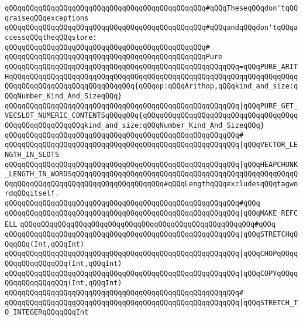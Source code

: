 \verb|qQQqqQQqqQQqqQQqqQQqqQQqqQQqqQQqqQQqqQQqqQQqqQQq#qQQqTheseqQQqdon'tqQQqraiseqQQqexceptions|\newline
\verb|qQQqqQQqqQQqqQQqqQQqqQQqqQQqqQQqqQQqqQQqqQQqqQQq#qQQqandqQQqdon'tqQQqaccessqQQqtheqQQqstore:|\newline
\verb|qQQqqQQqqQQqqQQqqQQqqQQqqQQqqQQqqQQqqQQqqQQqqQQq#|\newline
\verb|qQQqqQQqqQQqqQQqqQQqqQQqqQQqqQQqqQQqqQQqqQQqqQQqPure|\newline
\verb|qQQqqQQqqQQqqQQqqQQqqQQqqQQqqQQqqQQqqQQqqQQqqQQqqQQqqQQq=qQQqPURE_ARITHqQQqqQQqqQQqqQQqqQQqqQQqqQQqqQQqqQQqqQQqqQQqqQQqqQQqqQQqqQQqqQQqqQQqqQQqqQQqqQQqqQQqqQQqqQQqqQQqqQQq{qQQqop:qQQqArithop,qQQqkind_and_size:qQQqNumber_Kind_And_SizeqQQq}|\newline
\verb|qQQqqQQqqQQqqQQqqQQqqQQqqQQqqQQqqQQqqQQqqQQqqQQqqQQqqQQq|\verb#|qQQqPURE_GET_VECSLOT_NUMERIC_CONTENTSqQQqqQQq{qQQqqQQqqQQqqQQqqQQqqQQqqQQqqQQqqQQqqQQqqQQqqQQqqQQqqQQqkind_and_size:qQQqNumber_Kind_And_SizeqQQq}#\newline
\verb|qQQqqQQqqQQqqQQqqQQqqQQqqQQqqQQqqQQqqQQqqQQqqQQqqQQqqQQq#|\newline
\verb|qQQqqQQqqQQqqQQqqQQqqQQqqQQqqQQqqQQqqQQqqQQqqQQqqQQqqQQq|\verb#|qQQqVECTOR_LENGTH_IN_SLOTS#\newline
\verb|qQQqqQQqqQQqqQQqqQQqqQQqqQQqqQQqqQQqqQQqqQQqqQQqqQQqqQQq|\verb#|qQQqHEAPCHUNK_LENGTH_IN_WORDSqQQqqQQqqQQqqQQqqQQqqQQqqQQqqQQqqQQqqQQqqQQqqQQqqQQqqQQqqQQqqQQqqQQqqQQqqQQqqQQqqQQqqQQqqQQq#\verb|#qQQqLengthqQQqexcludesqQQqtagwordqQQqitself.|\newline
\verb|qQQqqQQqqQQqqQQqqQQqqQQqqQQqqQQqqQQqqQQqqQQqqQQqqQQqqQQq#qQQq|\newline
\verb|qQQqqQQqqQQqqQQqqQQqqQQqqQQqqQQqqQQqqQQqqQQqqQQqqQQqqQQq|\verb#|qQQqMAKE_REFCELL#\newline
\verb|qQQqqQQqqQQqqQQqqQQqqQQqqQQqqQQqqQQqqQQqqQQqqQQqqQQqqQQq#qQQq|\newline
\verb|qQQqqQQqqQQqqQQqqQQqqQQqqQQqqQQqqQQqqQQqqQQqqQQqqQQqqQQq|\verb#|qQQqSTRETCHqQQqqQQq(Int,qQQqInt)#\newline
\verb|qQQqqQQqqQQqqQQqqQQqqQQqqQQqqQQqqQQqqQQqqQQqqQQqqQQqqQQq|\verb#|qQQqCHOPqQQqqQQqqQQqqQQqqQQq(Int,qQQqInt)#\newline
\verb|qQQqqQQqqQQqqQQqqQQqqQQqqQQqqQQqqQQqqQQqqQQqqQQqqQQqqQQq|\verb#|qQQqCOPYqQQqqQQqqQQqqQQqqQQq(Int,qQQqInt)#\newline
\verb|qQQqqQQqqQQqqQQqqQQqqQQqqQQqqQQqqQQqqQQqqQQqqQQqqQQqqQQq#|\newline
\verb|qQQqqQQqqQQqqQQqqQQqqQQqqQQqqQQqqQQqqQQqqQQqqQQqqQQqqQQq|\verb#|qQQqSTRETCH_TO_INTEGERqQQqqQQqInt#\newline
